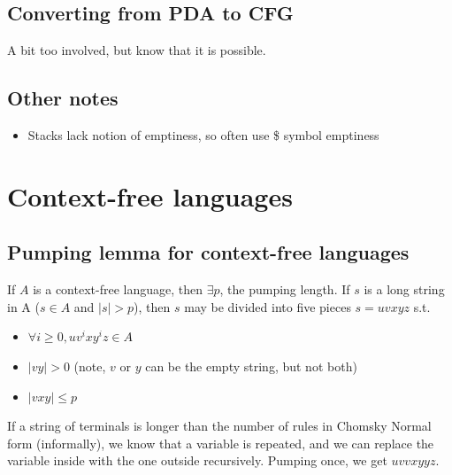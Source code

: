 \documentclass{article}
\begin{document}
\subsection{Converting from PDA to CFG}
A bit too involved, but know that it is possible.

\subsection{Other notes}
\begin{itemize}
    \item Stacks lack notion of emptiness, so often use \$ symbol emptiness\\
\end{itemize}

\section{Context-free languages}
\subsection{Pumping lemma for context-free languages}
If $A$ is a context-free language, then $\exists p$, the pumping length. If $s$ is a long string in A ($s \in A$ and $|s| > p$), then $s$ may be divided into five pieces $s=uvxyz$ s.t.
\begin{itemize}
    \item $\forall i \geq 0,uv^i xy^i z \in A$
    \item $|vy|>0$ (note, $v$ or $y$ can be the empty string, but not both)
    \item $|vxy| \leq p$
\end{itemize}
If a string of terminals is longer than the number of rules in Chomsky Normal form (informally), we know that a variable is repeated, and we can replace the variable inside with the one outside recursively. Pumping once, we get $uvvxyyz$.
\end{document}
